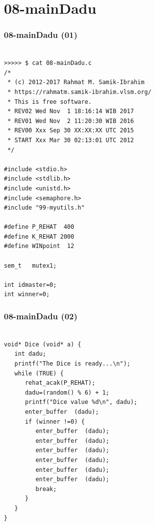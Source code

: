 \documentclass[aspectratio=169, xcolor=table, notheorems, hyperref={pdfpagelabels=false}]{beamer}
\begin{document}
\section{08-mainDadu}
\begin{frame}[fragile]
\frametitle{08-mainDadu (01)}
\begin{lstlisting}[basicstyle=\ttfamily\tiny]

>>>>> $ cat 08-mainDadu.c
/*
 * (c) 2012-2017 Rahmat M. Samik-Ibrahim
 * https://rahmatm.samik-ibrahim.vlsm.org/
 * This is free software.
 * REV02 Wed Nov  1 18:16:14 WIB 2017
 * REV01 Wed Nov  2 11:20:30 WIB 2016
 * REV00 Xxx Sep 30 XX:XX:XX UTC 2015
 * START Xxx Mar 30 02:13:01 UTC 2012
 */

#include <stdio.h>
#include <stdlib.h>
#include <unistd.h>
#include <semaphore.h>
#include "99-myutils.h"

#define P_REHAT  400
#define K_REHAT 2000
#define WINpoint  12

sem_t	mutex1;
	
int	idmaster=0;
int	winner=0;

\end{lstlisting}
\end{frame}

\begin{frame}[fragile]
\frametitle{08-mainDadu (02)}
\begin{lstlisting}[basicstyle=\ttfamily\tiny]

void* Dice (void* a) {
   int dadu;
   printf("The Dice is ready...\n");
   while (TRUE) {
      rehat_acak(P_REHAT);
      dadu=(random() % 6) + 1;
      printf("Dice value %d\n", dadu);
      enter_buffer  (dadu);
      if (winner !=0) {
         enter_buffer  (dadu);
         enter_buffer  (dadu);
         enter_buffer  (dadu);
         enter_buffer  (dadu);
         enter_buffer  (dadu);
         enter_buffer  (dadu);
         break;
      }
   }
}

\end{lstlisting}
\end{frame}
\end{document}

